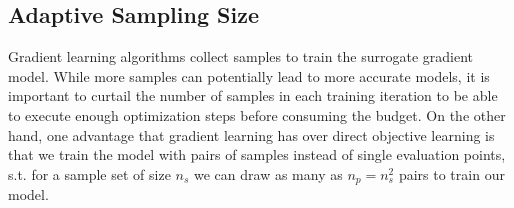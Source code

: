 

    


\subsection{Adaptive Sampling Size}
\label{sampling_size_adapt}
Gradient learning algorithms collect samples to train the surrogate gradient model. While more samples can potentially lead to more accurate models, it is important to curtail the number of samples in each training iteration to be able to execute enough optimization steps before consuming the budget. On the other hand, one advantage that gradient learning has over direct objective learning is that we train the model with pairs of samples instead of single evaluation points, s.t. for a sample set of size $n_s$ we can draw as many as $n_p=n_s^2$ pairs to train our model. 

